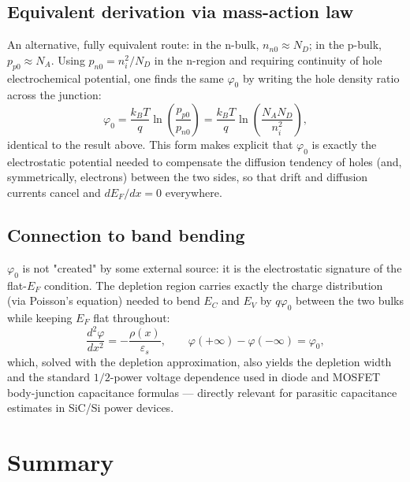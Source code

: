 \documentclass[11pt]{article}
\begin{document}
\subsection{Equivalent derivation via mass-action law}
An alternative, fully equivalent route: in the n-bulk, $n_{n0} \approx N_D$; in the p-bulk, $p_{p0} \approx N_A$. Using $p_{n0} = n_i^2/N_D$ in the n-region and requiring continuity of hole electrochemical potential, one finds the same $\varphi_0$ by writing the hole density ratio across the junction:
\begin{equation}
\varphi_0 = \frac{k_BT}{q}\ln\!\left(\frac{p_{p0}}{p_{n0}}\right) = \frac{k_BT}{q}\ln\!\left(\frac{N_A N_D}{n_i^2}\right),
\end{equation}
identical to the result above. This form makes explicit that $\varphi_0$ is exactly the electrostatic potential needed to compensate the diffusion tendency of holes (and, symmetrically, electrons) between the two sides, so that drift and diffusion currents cancel and $dE_F/dx = 0$ everywhere.

\subsection{Connection to band bending}
$\varphi_0$ is not "created" by some external source: it is the electrostatic signature of the flat-$E_F$ condition. The depletion region carries exactly the charge distribution (via Poisson's equation) needed to bend $E_C$ and $E_V$ by $q\varphi_0$ between the two bulks while keeping $E_F$ flat throughout:
\begin{equation}
\frac{d^2\varphi}{dx^2} = -\frac{\rho(x)}{\varepsilon_s}, \qquad \varphi(+\infty) - \varphi(-\infty) = \varphi_0,
\end{equation}
which, solved with the depletion approximation, also yields the depletion width and the standard $1/2$-power voltage dependence used in diode and MOSFET body-junction capacitance formulas — directly relevant for parasitic capacitance estimates in SiC/Si power devices.

\section{Summary}
\end{document}
